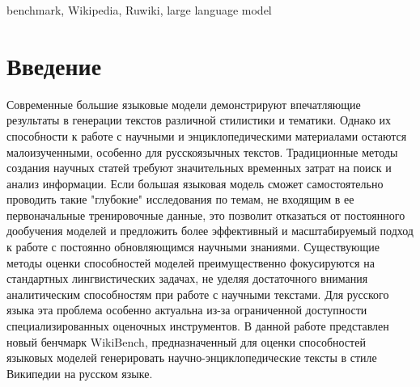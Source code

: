 \documentclass{article}
\theoremstyle{definition}
\theoremstyle{plain}
\begin{document}
\begin{altkeywords}
benchmark, Wikipedia, Ruwiki, large language model
\end{altkeywords}


\section*{Введение}

Современные большие языковые модели демонстрируют впечатляющие результаты в генерации текстов различной стилистики и тематики. 
Однако их способности к работе с научными и энциклопедическими материалами остаются малоизученными, особенно для русскоязычных текстов. 
Традиционные методы создания научных статей требуют значительных временных затрат на поиск и анализ информации. 
Если большая языковая модель сможет самостоятельно проводить такие "глубокие" исследования по темам, не входящим в ее первоначальные тренировочные данные, это позволит отказаться от постоянного дообучения моделей
и предложить более эффективный и масштабируемый подход к работе с постоянно обновляющимся научными знаниями.
Существующие методы оценки способностей моделей преимущественно фокусируются на стандартных лингвистических задачах, не уделяя достаточного внимания аналитическим способностям при работе с научными текстами.
Для русского языка эта проблема особенно актуальна из-за ограниченной доступности специализированных оценочных инструментов.
В данной работе представлен новый бенчмарк WikiBench, предназначенный для оценки способностей языковых моделей генерировать научно-энциклопедические тексты в стиле Википедии на русском языке. 
\end{document}
